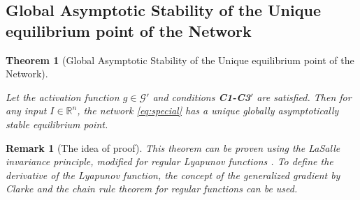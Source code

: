 \documentclass[journal]{IEEEtran}
\theoremstyle{myplain}
\newtheorem{theorem}{Theorem}
\newtheorem{remark}{Remark}
\begin{document}
\subsection{Global Asymptotic Stability of the Unique equilibrium point of the Network}
\begin{theorem}[Global Asymptotic Stability of the Unique equilibrium point of the Network]\label{main}


Let the activation function $g\in \mathcal{G'}$ and conditions \textbf{C1-C3$'$} are satisfied. Then for any input $I\in \mathbb{R}^n$, the network \eqref{eq:special} has a unique globally asymptotically stable equilibrium point.

\end{theorem}

\begin{remark}[The idea of proof] This theorem can be proven using the LaSalle invariance principle, modified for regular Lyapunov functions \cite{ShevitzPaden1994}. To define the derivative of the Lyapunov function, the concept of the generalized gradient by Clarke and the chain rule theorem for regular functions can be used.
\end{remark}
\end{document}
